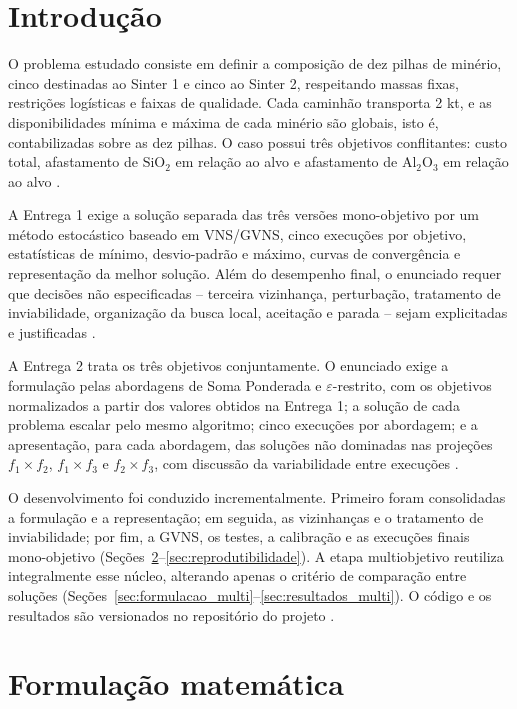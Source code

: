 \documentclass[10pt,twocolumn,a4paper]{article}
\begin{document}
\section{Introdução}

O problema estudado consiste em definir a composição de dez pilhas de minério, cinco destinadas ao Sinter 1 e cinco ao Sinter 2, respeitando massas fixas, restrições logísticas e faixas de qualidade. Cada caminhão transporta 2 kt, e as disponibilidades mínima e máxima de cada minério são globais, isto é, contabilizadas sobre as dez pilhas. O caso possui três objetivos conflitantes: custo total, afastamento de $\text{SiO}_2$ em relação ao alvo e afastamento de $\text{Al}_2\text{O}_3$ em relação ao alvo \cite{case_enunciado}.

A Entrega 1 exige a solução separada das três versões mono-objetivo por um método estocástico baseado em VNS/GVNS, cinco execuções por objetivo, estatísticas de mínimo, desvio-padrão e máximo, curvas de convergência e representação da melhor solução. Além do desempenho final, o enunciado requer que decisões não especificadas -- terceira vizinhança, perturbação, tratamento de inviabilidade, organização da busca local, aceitação e parada -- sejam explicitadas e justificadas \cite{case_enunciado}.

A Entrega 2 trata os três objetivos conjuntamente. O enunciado exige a formulação pelas abordagens de Soma Ponderada e $\varepsilon$-restrito, com os objetivos normalizados a partir dos valores obtidos na Entrega 1; a solução de cada problema escalar pelo mesmo algoritmo; cinco execuções por abordagem; e a apresentação, para cada abordagem, das soluções não dominadas nas projeções $f_1 \times f_2$, $f_1 \times f_3$ e $f_2 \times f_3$, com discussão da variabilidade entre execuções \cite{case_enunciado}.

O desenvolvimento foi conduzido incrementalmente. Primeiro foram consolidadas a formulação e a representação; em seguida, as vizinhanças e o tratamento de inviabilidade; por fim, a GVNS, os testes, a calibração e as execuções finais mono-objetivo (Seções~\ref{sec:formulacao}--\ref{sec:reprodutibilidade}). A etapa multiobjetivo reutiliza integralmente esse núcleo, alterando apenas o critério de comparação entre soluções (Seções~\ref{sec:formulacao_multi}--\ref{sec:resultados_multi}). O código e os resultados são versionados no repositório do projeto \cite{repo_projeto}.

\section{Formulação matemática}
\label{sec:formulacao}
\end{document}
